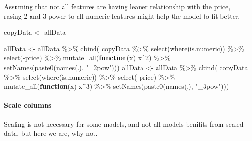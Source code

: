 \documentclass[
]{article}
\newenvironment{Shaded}{\begin{snugshade}}{\end{snugshade}}
\newcommand{\ControlFlowTok}[1]{\textcolor[rgb]{0.13,0.29,0.53}{\textbf{#1}}}
\newcommand{\DecValTok}[1]{\textcolor[rgb]{0.00,0.00,0.81}{#1}}
\newcommand{\FunctionTok}[1]{\textcolor[rgb]{0.00,0.00,0.00}{#1}}
\newcommand{\NormalTok}[1]{#1}
\newcommand{\OtherTok}[1]{\textcolor[rgb]{0.56,0.35,0.01}{#1}}
\newcommand{\SpecialCharTok}[1]{\textcolor[rgb]{0.00,0.00,0.00}{#1}}
\newcommand{\StringTok}[1]{\textcolor[rgb]{0.31,0.60,0.02}{#1}}
\begin{document}
Assuming that not all features are having leaner relationship with the
price, rasing 2 and 3 power to all numeric features might help the model
to fit better.

\begin{Shaded}
\begin{Highlighting}[]
\NormalTok{copyData }\OtherTok{\textless{}{-}}\NormalTok{ allData}

\NormalTok{allData }\OtherTok{\textless{}{-}}\NormalTok{ allData }\SpecialCharTok{\%\textgreater{}\%} \FunctionTok{cbind}\NormalTok{( copyData }\SpecialCharTok{\%\textgreater{}\%}
  \FunctionTok{select}\NormalTok{(}\FunctionTok{where}\NormalTok{(is.numeric)) }\SpecialCharTok{\%\textgreater{}\%}
  \FunctionTok{select}\NormalTok{(}\SpecialCharTok{{-}}\NormalTok{price) }\SpecialCharTok{\%\textgreater{}\%}
  \FunctionTok{mutate\_all}\NormalTok{(}\ControlFlowTok{function}\NormalTok{(x) x}\SpecialCharTok{\^{}}\DecValTok{2}\NormalTok{) }\SpecialCharTok{\%\textgreater{}\%}
  \FunctionTok{setNames}\NormalTok{(}\FunctionTok{paste0}\NormalTok{(}\FunctionTok{names}\NormalTok{(.), }\StringTok{"\_2pow"}\NormalTok{)))}
\NormalTok{allData }\OtherTok{\textless{}{-}}\NormalTok{ allData }\SpecialCharTok{\%\textgreater{}\%} \FunctionTok{cbind}\NormalTok{( copyData }\SpecialCharTok{\%\textgreater{}\%}
  \FunctionTok{select}\NormalTok{(}\FunctionTok{where}\NormalTok{(is.numeric)) }\SpecialCharTok{\%\textgreater{}\%}
  \FunctionTok{select}\NormalTok{(}\SpecialCharTok{{-}}\NormalTok{price) }\SpecialCharTok{\%\textgreater{}\%}
  \FunctionTok{mutate\_all}\NormalTok{(}\ControlFlowTok{function}\NormalTok{(x) x}\SpecialCharTok{\^{}}\DecValTok{3}\NormalTok{) }\SpecialCharTok{\%\textgreater{}\%}
  \FunctionTok{setNames}\NormalTok{(}\FunctionTok{paste0}\NormalTok{(}\FunctionTok{names}\NormalTok{(.), }\StringTok{"\_3pow"}\NormalTok{)))}
\end{Highlighting}
\end{Shaded}

\hypertarget{scale-columns}{%
\paragraph{Scale columns}\label{scale-columns}}

Scaling is not necessary for some models, and not all models benifits
from scaled data, but here we are, why not.
\end{document}
